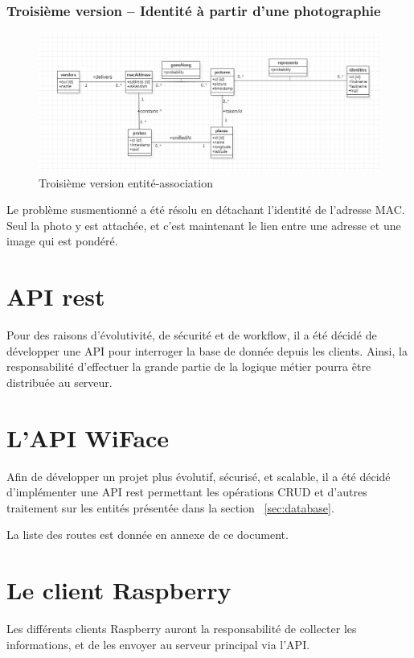 \subsubsection{Troisième version – Identité à partir d’une photographie}

\begin{figure}[H]
	\centering
	\includegraphics[width=12cm]{images/proto-3.png}
	\caption{Troisième version entité-association}
	\label{fig:arealytics}
\end{figure}

Le problème susmentionné a été résolu en détachant l’identité de l’adresse MAC. Seul la photo y est attachée, et
c’est maintenant le lien entre une adresse et une image qui est pondéré.

\section{API rest}

Pour des raisons d’évolutivité, de sécurité et de workflow, il a été décidé de développer une API pour interroger la
base de donnée depuis les clients. Ainsi, la responsabilité d’effectuer la grande partie de la logique métier pourra
être distribuée au serveur.

\section{L'API WiFace}

Afin de développer un projet plus évolutif, sécurisé, et scalable, il a été décidé d'implémenter une API rest permettant les opérations CRUD et d'autres
traitement sur les entités présentée dans la section ~\ref{sec:database}.

La liste des routes est donnée en annexe de ce document.

\section{Le client Raspberry}
Les différents clients Raspberry auront la responsabilité de collecter les informations, et de les envoyer
au serveur principal via l'API. 

